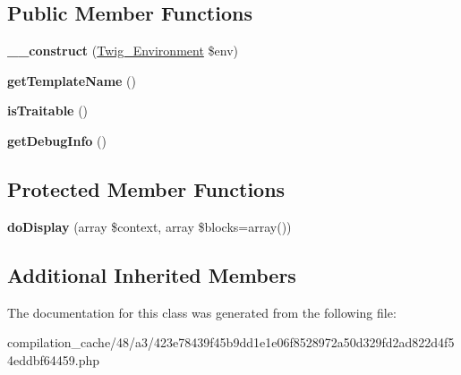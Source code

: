 \subsection*{Public Member Functions}
\begin{DoxyCompactItemize}
\item 
\hypertarget{class_____twig_template__48a3423e78439f45b9dd1e1e06f8528972a50d329fd2ad822d4f54eddbf64459_a4f8326243132c1450a81e0a817aa1be7}{}{\bfseries \+\_\+\+\_\+construct} (\hyperlink{class_twig___environment}{Twig\+\_\+\+Environment} \$env)\label{class_____twig_template__48a3423e78439f45b9dd1e1e06f8528972a50d329fd2ad822d4f54eddbf64459_a4f8326243132c1450a81e0a817aa1be7}

\item 
\hypertarget{class_____twig_template__48a3423e78439f45b9dd1e1e06f8528972a50d329fd2ad822d4f54eddbf64459_a621a3ccd148ed8b9e937da6959c98f39}{}{\bfseries get\+Template\+Name} ()\label{class_____twig_template__48a3423e78439f45b9dd1e1e06f8528972a50d329fd2ad822d4f54eddbf64459_a621a3ccd148ed8b9e937da6959c98f39}

\item 
\hypertarget{class_____twig_template__48a3423e78439f45b9dd1e1e06f8528972a50d329fd2ad822d4f54eddbf64459_aa9eb89be270f6afc256ef5e272b78a63}{}{\bfseries is\+Traitable} ()\label{class_____twig_template__48a3423e78439f45b9dd1e1e06f8528972a50d329fd2ad822d4f54eddbf64459_aa9eb89be270f6afc256ef5e272b78a63}

\item 
\hypertarget{class_____twig_template__48a3423e78439f45b9dd1e1e06f8528972a50d329fd2ad822d4f54eddbf64459_abd0ecb0136f4228db2bd963bfc1e20d7}{}{\bfseries get\+Debug\+Info} ()\label{class_____twig_template__48a3423e78439f45b9dd1e1e06f8528972a50d329fd2ad822d4f54eddbf64459_abd0ecb0136f4228db2bd963bfc1e20d7}

\end{DoxyCompactItemize}
\subsection*{Protected Member Functions}
\begin{DoxyCompactItemize}
\item 
\hypertarget{class_____twig_template__48a3423e78439f45b9dd1e1e06f8528972a50d329fd2ad822d4f54eddbf64459_adb62b7c226e07d30f836ed16158d924f}{}{\bfseries do\+Display} (array \$context, array \$blocks=array())\label{class_____twig_template__48a3423e78439f45b9dd1e1e06f8528972a50d329fd2ad822d4f54eddbf64459_adb62b7c226e07d30f836ed16158d924f}

\end{DoxyCompactItemize}
\subsection*{Additional Inherited Members}


The documentation for this class was generated from the following file\+:\begin{DoxyCompactItemize}
\item 
compilation\+\_\+cache/48/a3/423e78439f45b9dd1e1e06f8528972a50d329fd2ad822d4f54eddbf64459.\+php\end{DoxyCompactItemize}
